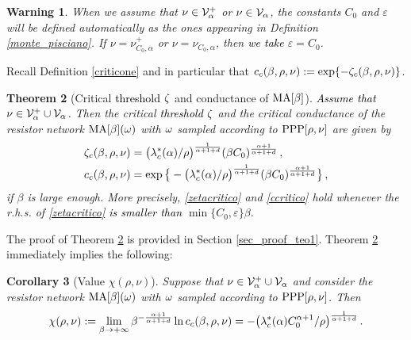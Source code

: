 \documentclass[12pt,a4paper,reqno]{amsart}
\newtheorem{Theorem}{Theorem}[section]
\newtheorem{Corollary}[Theorem]{Corollary}
\newtheorem{Warning}[Theorem]{Warning}
\newcommand{\cV}{\ensuremath{\mathcal V}}
\let\a=\alpha \let\b=\beta   \let\d=\delta  \let\e=\varepsilon
\let\r=\rho  \let\s=\sigma \let\t=\tau   \let\th=\vartheta
\newcommand{\rosso}{\textcolor{black}} %
\newcommand{\orc}{\textcolor{black}} %
\newcommand{\be}{\begin{equation}}
\newcommand{\en}{\end{equation}}
\newcommand{\cv}{\rosso{\cV_\alpha}}
\newcommand{\cvp}{\rosso{\cV^+_\alpha}}
\begin{document}
\begin{Warning}\label{pericolo} When we assume  that $\nu\in \cvp$  or $\nu\in \cv$,  the constants $C_0$ and $\e$ will  be defined automatically  as the ones appearing in Definition \ref{monte_pisciano}. If $\nu=\nu^+ _{C_0,\a}$ or $\nu= \nu _{C_0,\a}$, then \rosso{we take}  $\e=C_0$.
\end{Warning}
Recall Definition \ref{criticone} and in particular that  $c_c(\b,\rho,\nu):= \exp\{-  \z_c(\b,\rho,\nu) \}$.
\begin{Theorem}[Critical \rosso{threshold} $\zeta$ and conductance   of ${\rm MA}\text{$[\b]$}$] \label{teo1}  \rosso{Assume that $\nu \in \cvp\cup\cv$}. Then 
 the critical \rosso{threshold} $\zeta$ and the critical conductance  of the resistor network
${\rm MA}[\b](\o)$  with $\omega$ sampled according to ${\rm PPP}[\rho, \nu]$  are given by 
\begin{align}
\z_c(\b,\rho, \nu )& = \bigl( {\l^*_c(\a)/\r}\bigr)^{\frac{1}{\a+1+d}}
  (  \b C_0) ^{\frac{\a+1}{\a+1+d}}\,, \label{zetacritico}\\
c_c(\b,\rho, \nu )& = \exp\big\{- \bigl( {\l^*_c(\a)/\r}\bigr)^{\frac{1}{\a+1+d}}
  (  \b C_0) ^{\frac{\a+1}{\a+1+d}}\big\}\, ,\label{ccritico}
\end{align}
if  $\beta$ is large enough. More precisely, \eqref{zetacritico} and \eqref{ccritico} hold  whenever the  r.h.s.  of \eqref{zetacritico}  \orc{is smaller than} $\min\{C_0, \e\}\b$. 
\end{Theorem}


The proof of Theorem \ref{teo1} is provided in Section \ref{sec_proof_teo1}. 
Theorem \ref{teo1} immediately implies the following:
\begin{Corollary}[Value $\chi(\rho,\nu)$]\label{luna}
Suppose that $\nu \in \cvp\cup \cv$ and consider the resistor network
${\rm MA}[\b](\o)$  with $\omega$ sampled according to ${\rm PPP}[\rho, \nu]$. 
Then 
 \be\label{premium}
\chi(\rho, \nu):=\lim _{\b\to +\infty} \b^{- \frac{\rosso{\a+1}}{\rosso{\a+1+d}} } \ln c_c(\b,\rho,\nu )=  - \bigl( {\l^*_c(\a)   C_0^{\a+1}/\r}\bigr)^{\frac{1}{\a+1+d}}
     \,.
\en
\end{Corollary}
\smallskip
\end{document}
